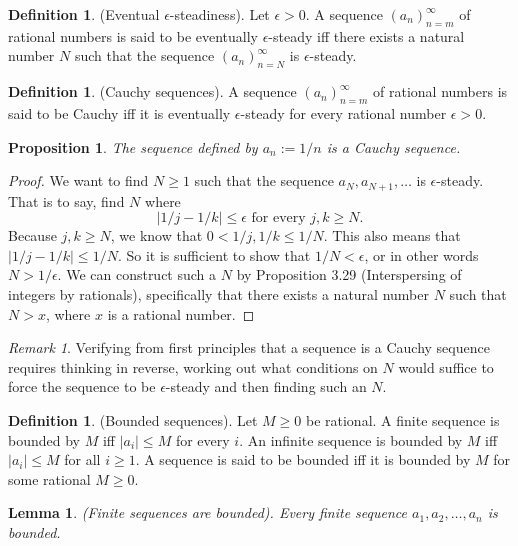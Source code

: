 \documentclass[12pt]{article}
\newtheorem{lemma}[theorem]{Lemma}
\newtheorem{proposition}[theorem]{Proposition}
\theoremstyle{definition}
\newtheorem{definition}[theorem]{Definition}
\theoremstyle{remark}
\newtheorem*{remark}{Remark}
\begin{document}
\begin{definition}
    (Eventual $\epsilon$-steadiness). Let $\epsilon > 0$. A sequence $(a_n)_{n=m}^\infty$ of rational numbers is said to be eventually $\epsilon$-steady iff there exists a natural number $N$ such that the sequence $(a_n)_{n=N}^\infty$ is $\epsilon$-steady.
\end{definition}

\begin{definition}
    (Cauchy sequences). A sequence $(a_n)_{n=m}^\infty$ of rational numbers is said to be Cauchy iff it is eventually $\epsilon$-steady for every rational number $\epsilon > 0$.
\end{definition}

\begin{proposition}
    The sequence defined by $a_n := 1/n$ is a Cauchy sequence.
\end{proposition}

\begin{proof}
    We want to find $N \geq 1$ such that the sequence $a_N, a_{N+1}, \ldots$ is $\epsilon$-steady. That is to say, find $N$ where \[
        |1/j - 1/k| \leq \epsilon \text{ for every } j, k \geq N
    .\] 
    Because $j, k \geq N$, we know that $0 < 1/j, 1/k \leq 1/N$. This also means that $|1/j - 1/k| \leq 1/N$. So it is sufficient to show that $1/N < \epsilon$, or in other words $N > 1/\epsilon$. We can construct such a $N$ by Proposition 3.29 (Interspersing of integers by rationals), specifically that there exists a natural number $N$ such that $N > x$, where $x$ is a rational number.
\end{proof}

\begin{remark}
    Verifying from first principles that a sequence is a Cauchy sequence requires thinking in reverse, working out what conditions on $N$ would suffice to force the sequence to be $\epsilon$-steady and then finding such an $N$.
\end{remark}

\begin{definition}
    (Bounded sequences). Let $M \geq 0$ be rational. A finite sequence is bounded by $M$ iff $|a_i| \leq M$ for every $i$. An infinite sequence is bounded by $M$ iff $|a_i| \leq M$ for all $i \geq 1$. A sequence is said to be bounded iff it is bounded by $M$ for some rational $M \geq 0$.
\end{definition}

\begin{lemma}
    (Finite sequences are bounded). Every finite sequence $a_1, a_2, \ldots, a_n$ is bounded.
\end{lemma}
\end{document}
